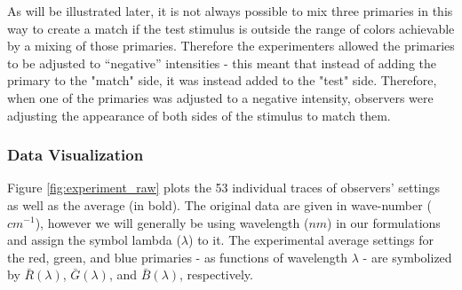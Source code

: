 \documentclass[twocolumn]{article}
\newif\ifinvert
\begin{document}
As will be illustrated later, it is not always possible to mix three primaries in this way to create a match if the test stimulus is outside the range of colors achievable by a mixing of those primaries.  Therefore the experimenters allowed the primaries to be adjusted to “negative” intensities - this meant that instead of adding the primary to the "match" side, it was instead added to the "test" side.  Therefore, when one of the primaries was adjusted to a negative intensity, observers were adjusting the appearance of both sides of the stimulus to match them.
\subsubsection{Data Visualization}
\begin{figure*}[h]
    \ifinvert
        
    \else
        
    \fi
    \caption{Individual (faded) and average (bold) settings of the red, green, and blue primary lights relative to the test light intensity plotted across all test light wave-numbers.  Positive settings indicate primary lights added together on the "match" side of the stimulus.  Negative settings indicate primary lights instead added to the "test" side of the stimulus along with the test light.  Where horizontal and vertical dotted lines cross, no settings were recorded (note there is zero individual variability at these points); instead it was presumed that each primary would exactly match itself in isolation.  Note that the step size between test lights is larger below 16,000 $cm^{-1}$ and above 21,500 $cm^{-1}$. IMAGE LINK, CODE LINK}\label{fig:experiment_raw}
\end{figure*}
Figure \ref{fig:experiment_raw} plots the 53 individual traces of observers' settings as well as the average (in bold).  The original data are given in wave-number ($cm^{-1}$), however we will generally be using wavelength ($nm$) in our formulations and assign the symbol lambda ($\lambda$) to it.  The experimental average settings for the red, green, and blue primaries - as functions of wavelength $\lambda$ - are symbolized by $\bar{R}(\lambda)$, $\bar{G}(\lambda)$, and $\bar{B}(\lambda)$, respectively.
\end{document}
